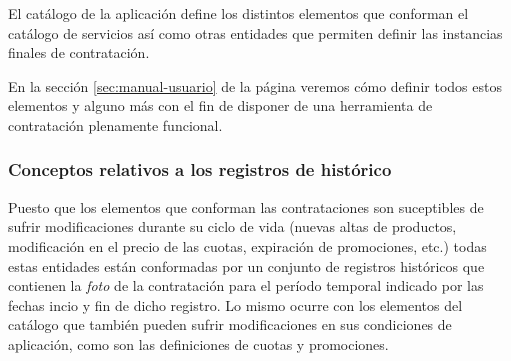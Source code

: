 El catálogo de la aplicación define los distintos elementos que conforman el catálogo de servicios así como otras entidades que permiten definir las instancias finales de contratación.



En la sección \ref{sec:manual-usuario} de la página \pageref{sec:manual-usuario} veremos cómo definir todos estos elementos y alguno más con el fin de disponer de una herramienta de contratación plenamente funcional.



\subsubsection{Conceptos relativos a los registros de histórico}
\label{sub:histórico-conceptos}

Puesto que los elementos que conforman las contrataciones son suceptibles de sufrir modificaciones durante su ciclo de vida (nuevas altas de productos, modificación en el precio de las cuotas, expiración de promociones, etc.) todas estas entidades están conformadas por un conjunto de registros históricos que contienen la \textit{foto} de la contratación para el período temporal indicado por las fechas incio y fin de dicho registro. Lo mismo ocurre con los elementos del catálogo que también pueden sufrir modificaciones en sus condiciones de aplicación, como son las definiciones de cuotas y promociones.

